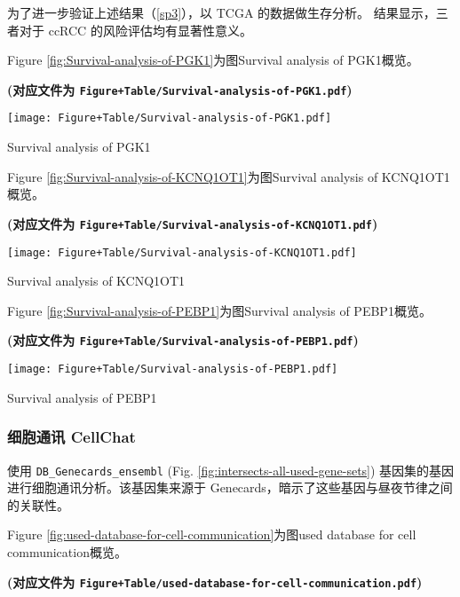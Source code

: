 \documentclass[
]{article}
\begin{document}
为了进一步验证上述结果（\ref{sp3}），以 TCGA 的数据做生存分析。
结果显示，三者对于 ccRCC 的风险评估均有显著性意义。

Figure \ref{fig:Survival-analysis-of-PGK1}为图Survival analysis of PGK1概览。

\textbf{(对应文件为 \texttt{Figure+Table/Survival-analysis-of-PGK1.pdf})}

\def\@captype{figure}
\begin{center}
\texttt{[image: Figure+Table/Survival-analysis-of-PGK1.pdf]}
\caption{Survival analysis of PGK1}\label{fig:Survival-analysis-of-PGK1}
\end{center}

Figure \ref{fig:Survival-analysis-of-KCNQ1OT1}为图Survival analysis of KCNQ1OT1概览。

\textbf{(对应文件为 \texttt{Figure+Table/Survival-analysis-of-KCNQ1OT1.pdf})}

\def\@captype{figure}
\begin{center}
\texttt{[image: Figure+Table/Survival-analysis-of-KCNQ1OT1.pdf]}
\caption{Survival analysis of KCNQ1OT1}\label{fig:Survival-analysis-of-KCNQ1OT1}
\end{center}

Figure \ref{fig:Survival-analysis-of-PEBP1}为图Survival analysis of PEBP1概览。

\textbf{(对应文件为 \texttt{Figure+Table/Survival-analysis-of-PEBP1.pdf})}

\def\@captype{figure}
\begin{center}
\texttt{[image: Figure+Table/Survival-analysis-of-PEBP1.pdf]}
\caption{Survival analysis of PEBP1}\label{fig:Survival-analysis-of-PEBP1}
\end{center}

\hypertarget{ux7ec6ux80deux901aux8baf-cellchat}{%
\subsubsection{细胞通讯 CellChat}\label{ux7ec6ux80deux901aux8baf-cellchat}}

使用 \texttt{DB\_Genecards\_ensembl} (Fig. \ref{fig:intersects-all-used-gene-sets}) 基因集的基因进行细胞通讯分析。该基因集来源于 Genecards，暗示了这些基因与昼夜节律之间的关联性。

Figure \ref{fig:used-database-for-cell-communication}为图used database for cell communication概览。

\textbf{(对应文件为 \texttt{Figure+Table/used-database-for-cell-communication.pdf})}
\end{document}
